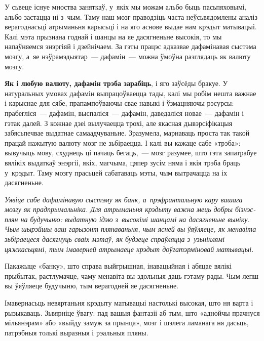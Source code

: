 У сьвеце існуе мноства заняткаў, у~якіх мы можам альбо быць пасьпяховымі, альбо застацца ні з~чым. Таму наш мозг праводзіць часта неўсьвядомлены аналіз верагоднасьці атрыманьня карысьці і на яго аснове выдае нам крэдыт матывацыі. Калі мэта прызнана годнай і шанцы на яе дасягненьне высокія, то мы напаўняемся энэргіяй і дзейнічаем. За гэты працэс адказвае дафамінавая сыстэма мозгу, а~яе нэўрамэдыятар~--- дафамін~--- можна ўмоўна разглядаць як валюту мозгу.

\textbf{Як і любую валюту, дафамін трэба зарабіць}, і яго заўсёды бракуе. У натуральных умовах дафамін выпрацоўваецца тады, калі мы робім нешта важнае і карыснае для сябе, прапампоўваючы свае навыкі і ўзмацняючы рэсурсы: прабегліся~--- дафамін, выспаліся~--- дафамін, даведаліся новае~--- дафамін і гэтак далей. З кожнае дзеі вылучаецца трохі, але якасная дывэрсіфікацыя забясьпечвае выдатнае самаадчуваньне. Зразумела, марнаваць проста так такой працай нажытую валюту мозг не зьбіраецца. І калі вы кажаце сабе «трэба»: вывучыць мову, схуднець ці пачаць бегаць,~--- мозг разумее, што гэта запатрабуе вялікіх выдаткаў энэргіі, якіх, магчыма, цяпер зусім няма і якія трэба браць у~крэдыт. Таму мозгу прасьцей сабатаваць мэты, чым вытрачацца на іх дасягненьне.

\emph{Уявіце сабе дафамінавую сыстэму як банк, а~прэфрантальную кару вашага мозгу як прадпрымальніка. Для атрыманьня крэдыту важна мець добры бізнэс-плян на будучыню: выдатную ідэю з~высокімі шанцамі на дасягненьне выніку. Чым шырэйшы ваш гарызонт плянаваньня, чым ясней вы ўяўляеце, як менавіта зьбіраецеся дасягнуць сваіх мэтаў, як будзеце спраўляцца з~узьніклямі цяжкасьцямі, тым імаверней атрымаеце крэдыт доўгатэрміновай матывацыі.}

Пакажыце «банку», што справа выйгрышная, інавацыйная і абяцае вялікі прыбытак, растлумачце, чаму менавіта вы здольныя даць гэтаму рады. Чым лепш вы ўяўляеце будучыню, тым верагодней яе дасягненьне.


Імавернасьць невяртаньня крэдыту матывацыі настолькі высокая, што ня варта і рызыкаваць. Зьвярніце ўвагу: пад вашыя фантазіі аб тым, што «аднойчы прачнуся мільянэрам» або «выйду замуж за прынца», мозг і шэлега ламанага ня дасьць, патрэбныя толькі выразныя і рэальныя пляны.

